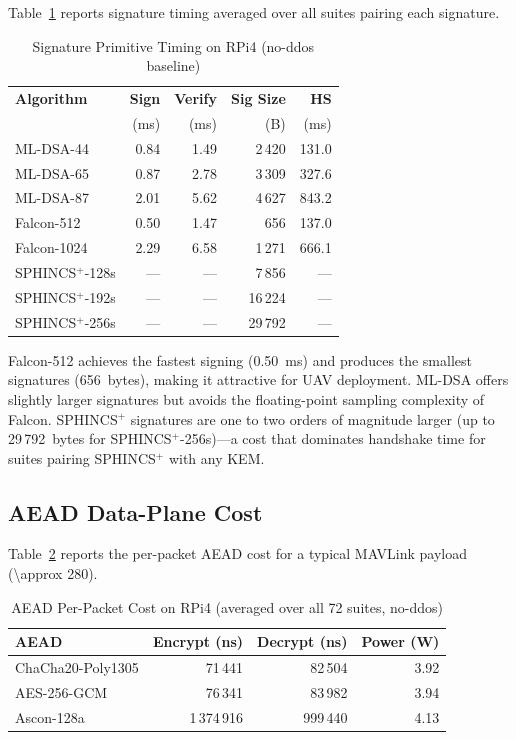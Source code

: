 \documentclass[conference]{IEEEtran}
\begin{document}
Table~\ref{tab:sig-timing} reports signature timing averaged over all suites pairing each signature.

\begin{table}[t]
\centering
\caption{Signature Primitive Timing on RPi4 (no-ddos baseline)}
\label{tab:sig-timing}
\small
\begin{tabular}{@{}lrrrr@{}}
\toprule
\textbf{Algorithm} & \textbf{Sign} & \textbf{Verify} & \textbf{Sig Size} & \textbf{HS} \\
 & (ms) & (ms) & (B) & (ms) \\
\midrule
ML-DSA-44 & 0.84 & 1.49 & 2\,420 & 131.0 \\
ML-DSA-65 & 0.87 & 2.78 & 3\,309 & 327.6 \\
ML-DSA-87 & 2.01 & 5.62 & 4\,627 & 843.2 \\
\midrule
Falcon-512 & 0.50 & 1.47 & 656 & 137.0 \\
Falcon-1024 & 2.29 & 6.58 & 1\,271 & 666.1 \\
\midrule
SPHINCS$^+$-128s & --- & --- & 7\,856 & --- \\
SPHINCS$^+$-192s & --- & --- & 16\,224 & --- \\
SPHINCS$^+$-256s & --- & --- & 29\,792 & --- \\
\bottomrule
\end{tabular}
\end{table}

Falcon-512 achieves the fastest signing (\SI{0.50}{\milli\second}) and produces the smallest signatures (656~bytes), making it attractive for UAV deployment.
ML-DSA offers slightly larger signatures but avoids the floating-point sampling complexity of Falcon.
SPHINCS$^+$ signatures are one to two orders of magnitude larger (up to 29\,792~bytes for SPHINCS$^+$-256s)---a cost that dominates handshake time for suites pairing SPHINCS$^+$ with any KEM.

\subsection{AEAD Data-Plane Cost}

Table~\ref{tab:aead-timing} reports the per-packet AEAD cost for a typical MAVLink payload (\SI{\approx 280}{\byte}).

\begin{table}[t]
\centering
\caption{AEAD Per-Packet Cost on RPi4 (averaged over all 72 suites, no-ddos)}
\label{tab:aead-timing}
\small
\begin{tabular}{@{}lrrr@{}}
\toprule
\textbf{AEAD} & \textbf{Encrypt (ns)} & \textbf{Decrypt (ns)} & \textbf{Power (W)} \\
\midrule
ChaCha20-Poly1305 & 71\,441 & 82\,504 & 3.92 \\
AES-256-GCM & 76\,341 & 83\,982 & 3.94 \\
Ascon-128a & 1\,374\,916 & 999\,440 & 4.13 \\
\bottomrule
\end{tabular}
\end{table}
\end{document}

